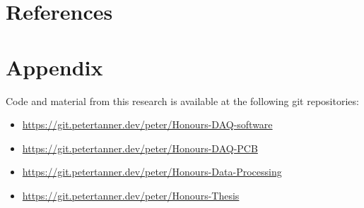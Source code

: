 \documentclass{report}
\begin{document}
\newpage

\section{References}

\printbibliography[heading=none]

\section{Appendix}

Code and material from this research is available at the following git repositories:

\begin{itemize}
  \item \url{https://git.petertanner.dev/peter/Honours-DAQ-software}
  \item \url{https://git.petertanner.dev/peter/Honours-DAQ-PCB}
  \item \url{https://git.petertanner.dev/peter/Honours-Data-Processing}
  \item \url{https://git.petertanner.dev/peter/Honours-Thesis}
\end{itemize}
\end{document}
